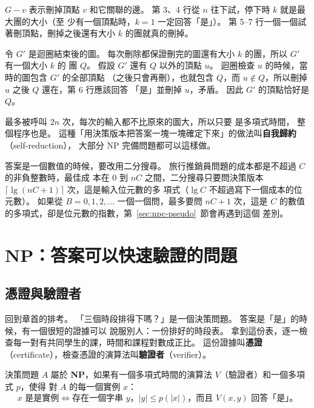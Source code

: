 $G - v$ 表示刪掉頂點 $v$ 和它關聯的邊。 第 3、4 行從 $n$ 往下試，停下時 $k$ 就是最大團的大小（至
少有一個頂點時，$k = 1$ 一定回答「是」）。 第 5--7 行一個一個試著刪頂點，刪掉之後還有大小 $k$
的團就真的刪掉。

\begin{whybox}[剩下的頂點恰好是一個團]
令 $G'$ 是迴圈結束後的圖。 每次刪除都保證刪完的圖還有大小 $k$ 的團，所以 $G'$ 有一個大小 $k$ 的
團 $Q$。 假設 $G'$ 還有 $Q$ 以外的頂點 $u$。 迴圈檢查 $u$ 的時候，當時的圖包含 $G'$ 的全部頂點
（之後只會再刪），也就包含 $Q$，而 $u \notin Q$，所以刪掉 $u$ 之後 $Q$ 還在，第 6 行應該回答
「是」並刪掉 $u$，矛盾。 因此 $G'$ 的頂點恰好是 $Q$。
\end{whybox}

 最多被呼叫 $2n$ 次，每次的輸入都不比原來的圖大，所以只要  是多項式時間，
整個程序也是。 這種「用決策版本把答案一塊一塊確定下來」的做法叫\textbf{自我歸約}（self-reduction），
大部分 NP 完備問題都可以這樣做。

答案是一個數值的時候，要改用二分搜尋。 旅行推銷員問題的成本都是不超過 $C$ 的非負整數時，最佳成
本在 $0$ 到 $nC$ 之間，二分搜尋只要問決策版本 $\lceil \lg(nC + 1) \rceil$ 次，這是輸入位元數的多
項式（$\lg C$ 不超過寫下一個成本的位元數）。 如果從 $B = 0, 1, 2, \ldots$ 一個一個問，最多要問
$nC + 1$ 次，這是 $C$ 的數值的多項式，卻是位元數的指數，第~\ref{sec:npc-pseudo}~節會再遇到這個
差別。

\section{NP：答案可以快速驗證的問題}
\label{sec:npc-np}

\subsection{憑證與驗證者}

回到章首的排考。 「三個時段排得下嗎？」是一個決策問題。 答案是「是」的時候，有一個很短的證據可以
說服別人：一份排好的時段表。 拿到這份表，逐一檢查每一對有共同學生的課，時間和課程對數成正比。
這份證據叫\textbf{憑證}（certificate），檢查憑證的演算法叫\textbf{驗證者}（verifier）。

\begin{definition}[NP]
\label{def:npc-np}
決策問題 $A$ 屬於 \textbf{NP}，如果有一個多項式時間的演算法 $V$（驗證者）和一個多項式 $p$，使得
對 $A$ 的每一個實例 $x$：
\[
x \text{ 是是實例} \iff \text{存在一個字串 } y\text{，} |y| \le p(|x|)\text{，而且 } V(x, y)
\text{ 回答「是」。}
\]
\end{definition}

